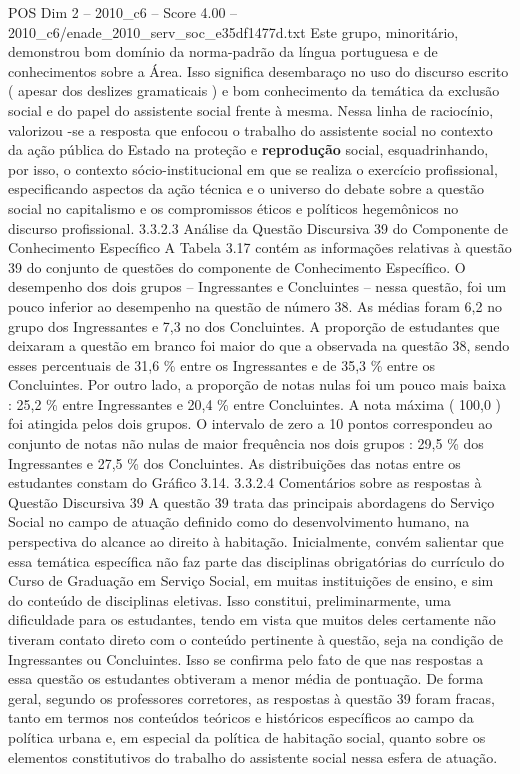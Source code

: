 \begin{textsample}{POS Dim 2 – 2010\_c6 – Score 4.00 – 2010\_c6/enade\_2010\_serv\_soc\_e35df1477d.txt}
Este grupo, minoritário, demonstrou bom domínio da norma-padrão da língua portuguesa e de conhecimentos sobre a Área.
Isso significa desembaraço no uso do discurso escrito ( apesar dos deslizes gramaticais ) e bom conhecimento da temática da exclusão social e do papel do assistente social frente à mesma.
Nessa linha de raciocínio, valorizou -se a resposta que enfocou o trabalho do assistente social no contexto da ação pública do Estado na proteção e \textbf{reprodução} social, esquadrinhando, por isso, o contexto sócio-institucional em que se realiza o exercício profissional, especificando aspectos da ação técnica e o universo do debate sobre a questão social no capitalismo e os compromissos éticos e políticos hegemônicos no discurso profissional. 3.3.2.3 Análise da Questão Discursiva 39 do Componente de Conhecimento Específico A Tabela 3.17 contém as informações relativas à questão 39 do conjunto de questões do componente de Conhecimento Específico.
O desempenho dos dois grupos – Ingressantes e Concluintes – nessa questão, foi um pouco inferior ao desempenho na questão de número 38.
As médias foram 6,2 no grupo dos Ingressantes e 7,3 no dos Concluintes.
A proporção de estudantes que deixaram a questão em branco foi maior do que a observada na questão 38, sendo esses percentuais de 31,6 \% entre os Ingressantes e de 35,3 \% entre os Concluintes.
Por outro lado, a proporção de notas nulas foi um pouco mais baixa : 25,2 \% entre Ingressantes e 20,4 \% entre Concluintes.
A nota máxima ( 100,0 ) foi atingida pelos dois grupos.
O intervalo de zero a 10 pontos correspondeu ao conjunto de notas não nulas de maior frequência nos dois grupos : 29,5 \% dos Ingressantes e 27,5 \% dos Concluintes.
As distribuições das notas entre os estudantes constam do Gráfico 3.14. 3.3.2.4 Comentários sobre as respostas à Questão Discursiva 39 A questão 39 trata das principais abordagens do Serviço Social no campo de atuação definido como do desenvolvimento humano, na perspectiva do alcance ao direito à habitação.
Inicialmente, convém salientar que essa temática específica não faz parte das disciplinas obrigatórias do currículo do Curso de Graduação em Serviço Social, em muitas instituições de ensino, e sim do conteúdo de disciplinas eletivas.
Isso constitui, preliminarmente, uma dificuldade para os estudantes, tendo em vista que muitos deles certamente não tiveram contato direto com o conteúdo pertinente à questão, seja na condição de Ingressantes ou Concluintes.
Isso se confirma pelo fato de que nas respostas a essa questão os estudantes obtiveram a menor média de pontuação.
De forma geral, segundo os professores corretores, as respostas à questão 39 foram fracas, tanto em termos nos conteúdos teóricos e históricos específicos ao campo da política urbana e, em especial da política de habitação social, quanto sobre os elementos constitutivos do trabalho do assistente social nessa esfera de atuação.

\end{textsample}
